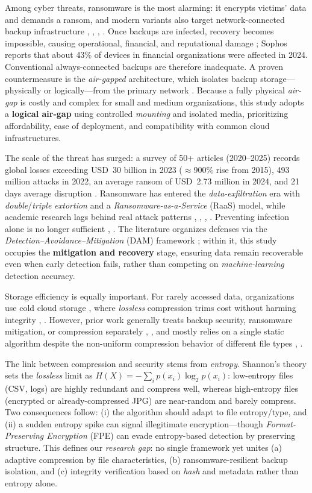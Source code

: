 \documentclass{iaesarticle}
\begin{document}
Among cyber threats, ransomware is the most alarming: it encrypts victims' data and demands a ransom, and modern variants also target network-connected backup infrastructure \cite{5}, \cite{6}, \cite{7}, \cite{8}. Once backups are infected, recovery becomes impossible, causing operational, financial, and reputational damage \cite{9}; Sophos reports that about 43\% of devices in financial organizations were affected in 2024. Conventional always-connected backups are therefore inadequate. A proven countermeasure is the \textit{air-gapped} architecture, which isolates backup storage---physically or logically---from the primary network \cite{10}. Because a fully physical \textit{air-gap} is costly and complex for small and medium organizations, this study adopts a \textbf{logical air-gap} using controlled \textit{mounting} and isolated media, prioritizing affordability, ease of deployment, and compatibility with common cloud infrastructures.

The scale of the threat has surged: a survey of 50+ articles (2020--2025) records global losses exceeding USD~30 billion in 2023 ($\approx$900\% rise from 2015), 493 million attacks in 2022, an average ransom of USD~2.73 million in 2024, and 21 days average disruption \cite{41}. Ransomware has entered the \textit{data-exfiltration} era with \textit{double}/\textit{triple extortion} and a \textit{Ransomware-as-a-Service} (RaaS) model, while academic research lags behind real attack patterns \cite{23}, \cite{26}, \cite{40}, \cite{33}. Preventing infection alone is no longer sufficient \cite{42}, \cite{46}. The literature organizes defenses via the \textit{Detection--Avoidance--Mitigation} (DAM) framework \cite{42}; within it, this study occupies the \textbf{mitigation and recovery} stage, ensuring data remain recoverable even when early detection fails, rather than competing on \textit{machine-learning} detection accuracy.

Storage efficiency is equally important. For rarely accessed data, organizations use cold cloud storage \cite{11}, where \textit{lossless} compression trims cost without harming integrity \cite{12}, \cite{13}. However, prior work generally treats backup security, ransomware mitigation, or compression separately \cite{14}, \cite{15}, and mostly relies on a single static algorithm despite the non-uniform compression behavior of different file types \cite{16}, \cite{17}.

The link between compression and security stems from \textit{entropy}. Shannon's theory sets the \textit{lossless} limit as $H(X) = -\sum_{i} p(x_i)\log_2 p(x_i)$: low-entropy files (CSV, logs) are highly redundant and compress well, whereas high-entropy files (encrypted or already-compressed JPG) are near-random and barely compress. Two consequences follow: (i) the algorithm should adapt to file entropy/type, and (ii) a sudden entropy spike can signal illegitimate encryption---though \textit{Format-Preserving Encryption} (FPE) can evade entropy-based detection by preserving structure. This defines our \textit{research gap}: no single framework yet unites (a) adaptive compression by file characteristics, (b) ransomware-resilient backup isolation, and (c) integrity verification based on \textit{hash} and metadata rather than entropy alone.
\end{document}

